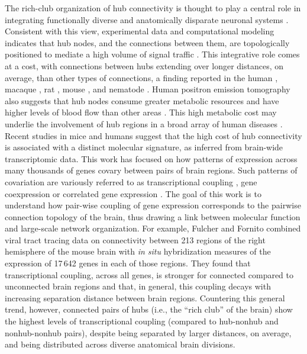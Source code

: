 \documentclass[10pt,letterpaper]{article}
\begin{document}
The rich-club organization of hub connectivity is thought to play a central role in integrating functionally diverse and anatomically disparate neuronal systems \cite{Fornito2015, vandenHeuvel:2013ij, ZamoraLopez:2010hy, Crossley2014, Crossley:2013kl}.
Consistent with this view, experimental data and computational modeling indicates that hub nodes, and the connections between them, are topologically positioned to mediate a high volume of signal traffic \cite{vandenHeuvel:2012kh, Harriger2012, Misic:2014it, Misic:2015jw}.
This integrative role comes at a cost, with connections between hubs extending over longer distances, on average, than other types of connections, a finding reported in the human \cite{vandenHeuvel:2012kh}, macaque \cite{Harriger2012}, rat \cite{VandenHeuvel2016b}, mouse \cite{Fulcher:2016ck}, and nematode \cite{Towlson2013}.
Human positron emission tomography also suggests that hub nodes consume greater metabolic resources and have higher levels of blood flow than other areas \cite{Tomasi:2013kl, Collin:2014kq, Liang2013a}.
This high metabolic cost may underlie the involvement of hub regions in a broad array of human diseases \cite{Fornito2015, Bullmore:2012vl, Crossley2014}. \\ 
Recent studies in mice and humans suggest that the high cost of hub connectivity is associated with a distinct
molecular signature, as inferred from brain-wide transcriptomic data. 
This work has focused on how patterns of expression across many thousands of genes covary between pairs of brain regions.
Such patterns of covariation are variously referred to as transcriptional coupling \cite{Fulcher:2016ck}, gene coexpression \cite{Krienen:2016eq} or correlated gene expression \cite{Richiardi2015, Mills2017, Goel2014}.
The goal of this work is to understand how pair-wise coupling of gene expression corresponds to the pairwise connection topology of the brain, thus drawing a link between molecular function and large-scale network organization.
For example, Fulcher and Fornito \cite{Fulcher:2016ck} combined viral tract tracing data on connectivity between 213 regions of the right hemisphere of the mouse brain \cite{Oh2014} with \emph{in situ} hybridization measures of the expression of 17\,642 genes in each of those regions.
They found that transcriptional coupling, across all genes, is stronger for connected compared to unconnected brain regions and that, in general, this coupling decays with increasing separation distance between brain regions.
Countering this general trend, however, connected pairs of hubs (i.e., the ``rich club'' of the brain) show the highest levels of transcriptional coupling (compared to hub-nonhub and nonhub-nonhub pairs), despite being separated by larger distances, on average, and being distributed across diverse anatomical brain divisions.
\end{document}
